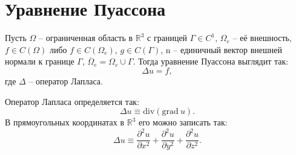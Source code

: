 \section{Уравнение Пуассона}
    Пусть \( \Omega \) -- ограниченная область в \( \mathbb{R}^3 \) с границей \( \Gamma \in C^1 \), \( \Omega_e \) -- её внешность, \( f \in C\left( \Omega \right) \) либо \( f \in C\left( \Omega_e \right) \), \( g \in C \left( \Gamma \right) \), \( \mathrm{n} \) -- единичный вектор внешней нормали к границе \(\Gamma\), \( \overline{\Omega}_e = \Omega_e \cup \Gamma \). Тогда уравнение Пуассона выглядит так:
    \begin{equation}
        \Delta u = f, \label{lapl}
    \end{equation}
    где \(\Delta\) -- оператор Лапласа.

    \begin{remark}
        Оператор Лапласа определяется так:
        \[
            \Delta u \equiv \mathrm{div} (\mathrm{grad} ~ u).
        \]
        В прямоугольных координатах в $\mathbb{R}^3$ его можно записать так:
        \[
            \Delta u \equiv \frac{\partial^2 u}{\partial x^2} + \frac{\partial^2 u}{\partial y^2} + \frac{\partial^2 u}{\partial z^2}.
        \]
    \end{remark}


